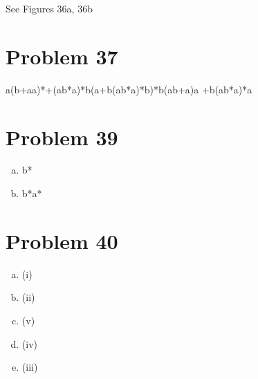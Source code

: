 \documentclass[11pt]{article}
\begin{document}
See Figures 36a, 36b

\section*{Problem 37}

a(b+aa)*+(ab*a)*b(a+b(ab*a)*b)*b(ab+a)a +b(ab*a)*a

\section*{Problem 39}

\begin{enumerate}[(a)]
	\item b*
	\item b*a*
	
\end{enumerate}

\section*{Problem 40}

\begin{enumerate}[(a)]
	\item (i)
	\item (ii)
	\item (v)
	\item (iv)
	\item (iii)
	
\end{enumerate}
\end{document}
